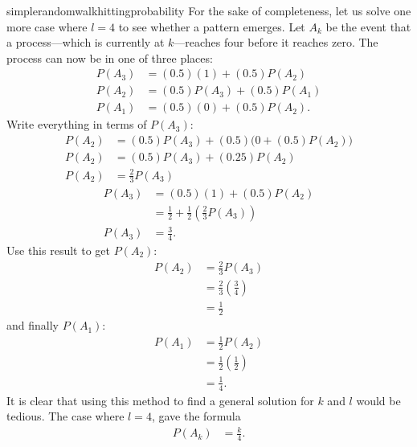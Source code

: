 \begin{answer}{simplerandomwalkhittingprobability}
For the sake of completeness, let us solve one more case where $l=4$ to see whether a pattern emerges.
Let $A_k$ be the event that a process---which is currently at $k$---reaches four before it reaches zero.
The process can now be in one of three places:
\begin{align*}
P(A_3) &= (0.5)(1) + (0.5)P(A_2)  \\
P(A_2) &= (0.5)P(A_3) + (0.5)P(A_1) \\
P(A_1) &= (0.5)(0) + (0.5)P(A_2)
\text{.}
\end{align*}
Write everything in terms of $P(A_3)$:
\begin{align*}
P(A_2) &= (0.5)P(A_3) + (0.5)\Big(0 + (0.5) P(A_2) \Big)  \\
P(A_2) &= (0.5) P(A_3)  + (0.25) P(A_2)  \\
P(A_2) &= \frac{2}{3} P(A_3)
\end{align*}
\begin{align*}
P(A_3) &= (0.5)(1) + (0.5) P(A_2)   \\
       &= \frac{1}{2} + \frac{1}{2}\left(\frac{2}{3}P(A_3)\right)  \\
            P(A_3) &= \frac{3}{4}
\text{.}
\end{align*}
Use this result to get $P(A_2)$:
\begin{align*}
P(A_2) &= \frac{2}{3} P(A_3)  \\
       &= \frac{2}{3}\left(\frac{3}{4}\right) \\
       &= \frac{1}{2}
\end{align*}
and finally $P(A_1)$:
\begin{align*}
P(A_1) &= \frac{1}{2} P(A_2)        \\
       &= \frac{1}{2}\left( \frac{1}{2} \right) \\
       &= \frac{1}{4}
\text{.}
\end{align*}
It is clear that using this method to find a general solution for $k$ and $l$ would be tedious.
The case where $l=4$, gave the formula
\begin{align*}
P(A_k) &= \frac{k}{4}
\text{.}
\end{align*}


\end{answer}
